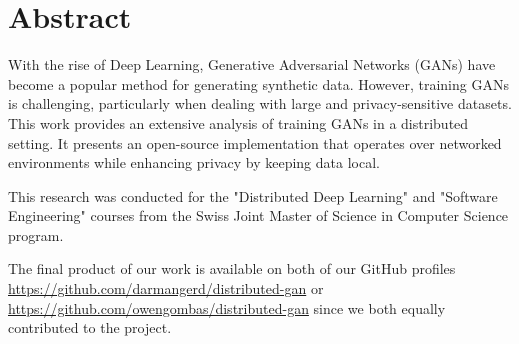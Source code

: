 \chapter{Abstract}
With the rise of Deep Learning, Generative Adversarial Networks (GANs) have become a popular method for generating synthetic data. However, training GANs is challenging, particularly when dealing with large and privacy-sensitive datasets. This work provides an extensive analysis of training GANs in a distributed setting. It presents an open-source implementation that operates over networked environments while enhancing privacy by keeping data local.

This research was conducted for the "Distributed Deep Learning" and "Software Engineering" courses from the Swiss Joint Master of Science in Computer Science program.

The final product of our work is available on both of our GitHub profiles \url{https://github.com/darmangerd/distributed-gan} or \url{https://github.com/owengombas/distributed-gan} since we both equally contributed to the project.
